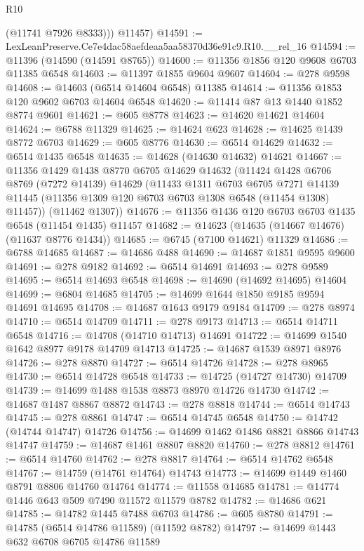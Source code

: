 \begin{lexlean}{R10}
\begin{coremodule}
          (@11741 @7926 @8333)))
      @11457)
@14591 := LexLeanPreserve.Ce7e4dac58aefdeaa5aa58370d36e91c9.R10.__rel_16
@14594 := @11396 (@14590 (@14591 @8765))
@14600 := @11356 @1856 @120 @9608 @6703 @11385 @6548
@14603 := @11397 @1855 @9604 @9607
@14604 := @278 @9598
@14608 := @14603 (@6514 @14604 @6548) @11385
@14614 := @11356 @1853 @120 @9602 @6703 @14604 @6548
@14620 := @11414 @87 @13 @1440 @1852 @8774 @9601
@14621 := @605 @8778
@14623 := @14620 @14621 @14604
@14624 := @6788 @11329
@14625 := @14624 @623
@14628 := @14625 @1439 @8772 @6703
@14629 := @605 @8776
@14630 := @6514 @14629
@14632 := @6514 @1435 @6548
@14635 := @14628 (@14630 @14632) @14621
@14667 := @11356
    @1429
    @1438
    @8770
    @6705
    @14629
    @14632
    (@11424
      @1428
      @6706
      @8769
      (@7272 @14139)
      @14629
      (@11433
        @1311
        @6703
        @6705
        @7271
        @14139
        @11445
        (@11356 @1309 @120 @6703 @6703 @1308 @6548 (@11454 @1308) @11457))
      (@11462 @1307))
@14676 := @11356 @1436 @120 @6703 @6703 @1435 @6548 (@11454 @1435) @11457
@14682 := @14623 (@14635 (@14667 @14676) (@11637 @8776 @1434))
@14685 := @6745 (@7100 @14621) @11329
@14686 := @6788 @14685
@14687 := @14686 @488
@14690 := @14687 @1851 @9595 @9600
@14691 := @278 @9182
@14692 := @6514 @14691
@14693 := @278 @9589
@14695 := @6514 @14693 @6548
@14698 := @14690 (@14692 @14695) @14604
@14699 := @6804 @14685
@14705 := @14699 @1644 @1850 @9185 @9594 @14691 @14695
@14708 := @14687 @1643 @9179 @9184
@14709 := @278 @8974
@14710 := @6514 @14709
@14711 := @278 @9173
@14713 := @6514 @14711 @6548
@14716 := @14708 (@14710 @14713) @14691
@14722 := @14699 @1540 @1642 @8977 @9178 @14709 @14713
@14725 := @14687 @1539 @8971 @8976
@14726 := @278 @8870
@14727 := @6514 @14726
@14728 := @278 @8965
@14730 := @6514 @14728 @6548
@14733 := @14725 (@14727 @14730) @14709
@14739 := @14699 @1488 @1538 @8873 @8970 @14726 @14730
@14742 := @14687 @1487 @8867 @8872
@14743 := @278 @8818
@14744 := @6514 @14743
@14745 := @278 @8861
@14747 := @6514 @14745 @6548
@14750 := @14742 (@14744 @14747) @14726
@14756 := @14699 @1462 @1486 @8821 @8866 @14743 @14747
@14759 := @14687 @1461 @8807 @8820
@14760 := @278 @8812
@14761 := @6514 @14760
@14762 := @278 @8817
@14764 := @6514 @14762 @6548
@14767 := @14759 (@14761 @14764) @14743
@14773 := @14699 @1449 @1460 @8791 @8806 @14760 @14764
@14774 := @11558 @14685
@14781 := @14774 @1446 @643 @509 @7490 @11572 @11579 @8782
@14782 := @14686 @621
@14785 := @14782 @1445 @7488 @6703
@14786 := @605 @8780
@14791 := @14785 (@6514 @14786 @11589) (@11592 @8782)
@14797 := @14699 @1443 @632 @6708 @6705 @14786 @11589

\end{coremodule}
\end{lexlean}
